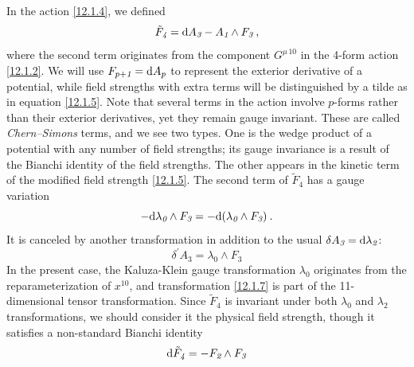 In the action \eqref{12.1.4}, we defined
\begin{equation}
	\tilde{F}_{\textit{4}}= \mathrm{d} A_{\textit{3}}-A_{\textit{1}}\wedge F_{\textit{3}} \:, \label{12.1.5}
\end{equation}
where the second term originates from the component $G^{\mu\,10}$ in the 4-form action \eqref{12.1.2}. We will use $F_{p+\textit{1}}=\mathrm{d} A_{p}$ to represent the exterior derivative of a potential, while field strengths with extra terms will be distinguished by a tilde as in equation \eqref{12.1.5}. Note that several terms in the action involve $p$-forms rather than their exterior derivatives, yet they remain gauge invariant. These are called \textit{Chern--Simons} terms, and we see two types. One is the wedge product of a potential with any number of field strengths; its gauge invariance is a result of the Bianchi identity of the field strengths. The other appears in the kinetic term of the modified field strength \eqref{12.1.5}. The second term of $\tilde{F}_{\textit{4}}$ has a gauge variation
\begin{equation}
	{-}\mathrm{d}\lambda_{\textit{0}} \wedge F_{\textit{3}} = - \mathrm{d}(\lambda_{\textit{0}}\wedge F_{\textit{3}}) \:. \label{12.1.6}
\end{equation}
It is canceled by another transformation in addition to the usual $\delta A_{\textit{3}}=\mathrm{d}\lambda_{\textit{2}}$:
\begin{equation}
	\delta^{\prime}A_{\textit{3}}=\lambda_{\textit{0}}\wedge F_{\textit{3}} \label{12.1.7}
\end{equation}
In the present case, the Kaluza-Klein gauge transformation $\lambda_{\textit{0}}$ originates from the reparameterization of $x^{10}$, and transformation \eqref{12.1.7} is part of the 11-dimensional tensor transformation. Since $\tilde{F}_{\textit{4}}$ is invariant under both $\lambda_{\textit{0}}$ and $\lambda_{\textit{2}}$ transformations, we should consider it the physical field strength, though it satisfies a non-standard Bianchi identity
\begin{equation}
	\mathrm{d} \tilde{F}_{\textit{4}}=-F_{\textit{2}}\wedge F_{\textit{3}}
\end{equation}
